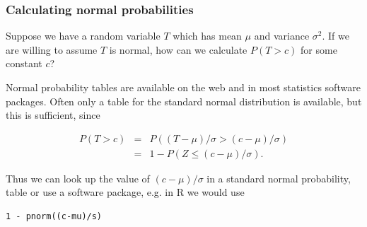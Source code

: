 \begin{frame}[fragile]
\frametitle{Calculating normal probabilities}

Suppose we have a random variable $T$ which has mean $\mu$ and
variance $\sigma^2$.  If we are willing to assume $T$ is normal, how
can we calculate $P(T>c)$ for some constant $c$?

Normal probability tables are available on the web and in most
statistics software packages.  Often only a table for the standard
normal distribution is available, but this is sufficient, since

\vspace{-0.5cm}

\begin{eqnarray*}
P(T>c) &=& P((T-\mu)/\sigma > (c-\mu)/\sigma)\\ &=& 1 - P(Z \le
(c-\mu)/\sigma).
\end{eqnarray*}

Thus we can look up the value of $(c-\mu)/\sigma$ in a standard normal
probability, table or use a software package, e.g. in R we would use

\begin{lstlisting}
1 - pnorm((c-mu)/s)
\end{lstlisting}

\end{frame}

